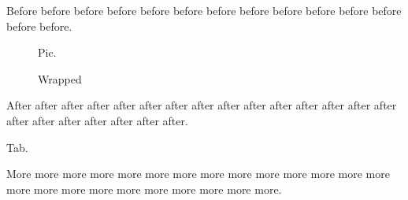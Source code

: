 \documentclass{article}
\begin{document}
Before before before before before before before before before before before before before before.
\begin{figure}
Pic.
\caption{Wrapped}
\end{figure}
After after after after after after after after after after after after after after after after after after after after after after.
\begin{table}
Tab.
\caption{Wrapped table}
\end{table}
More more more more more more more more more more more more more more more more more more more more more more more more.
\end{document}
